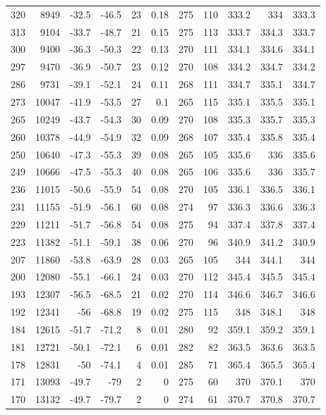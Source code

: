 \documentclass{article}
\begin{document}
\begin{longtable}{|r|r|r|r|r|r|r|r|r|r|r}
320 & 8949 & -32.5 & -46.5 & 23 & 0.18 & 275 & 110 & 333.2 & 334 & 333.3 \\
313 & 9104 & -33.7 & -48.7 & 21 & 0.15 & 275 & 113 & 333.7 & 334.3 & 333.7 \\
300 & 9400 & -36.3 & -50.3 & 22 & 0.13 & 270 & 111 & 334.1 & 334.6 & 334.1 \\
297 & 9470 & -36.9 & -50.7 & 23 & 0.12 & 270 & 108 & 334.2 & 334.7 & 334.2 \\
286 & 9731 & -39.1 & -52.1 & 24 & 0.11 & 268 & 111 & 334.7 & 335.1 & 334.7 \\
273 & 10047 & -41.9 & -53.5 & 27 & 0.1 & 265 & 115 & 335.1 & 335.5 & 335.1 \\
265 & 10249 & -43.7 & -54.3 & 30 & 0.09 & 270 & 108 & 335.3 & 335.7 & 335.3 \\
260 & 10378 & -44.9 & -54.9 & 32 & 0.09 & 268 & 107 & 335.4 & 335.8 & 335.4 \\
250 & 10640 & -47.3 & -55.3 & 39 & 0.08 & 265 & 105 & 335.6 & 336 & 335.6 \\
249 & 10666 & -47.5 & -55.3 & 40 & 0.08 & 265 & 106 & 335.6 & 336 & 335.7 \\
236 & 11015 & -50.6 & -55.9 & 54 & 0.08 & 270 & 105 & 336.1 & 336.5 & 336.1 \\
231 & 11155 & -51.9 & -56.1 & 60 & 0.08 & 274 & 97 & 336.3 & 336.6 & 336.3 \\
229 & 11211 & -51.7 & -56.8 & 54 & 0.08 & 275 & 94 & 337.4 & 337.8 & 337.4 \\
223 & 11382 & -51.1 & -59.1 & 38 & 0.06 & 270 & 96 & 340.9 & 341.2 & 340.9 \\
207 & 11860 & -53.8 & -63.9 & 28 & 0.03 & 265 & 105 & 344 & 344.1 & 344 \\
200 & 12080 & -55.1 & -66.1 & 24 & 0.03 & 270 & 112 & 345.4 & 345.5 & 345.4 \\
193 & 12307 & -56.5 & -68.5 & 21 & 0.02 & 270 & 114 & 346.6 & 346.7 & 346.6 \\
192 & 12341 & -56 & -68.8 & 19 & 0.02 & 275 & 115 & 348 & 348.1 & 348 \\
184 & 12615 & -51.7 & -71.2 & 8 & 0.01 & 280 & 92 & 359.1 & 359.2 & 359.1 \\
181 & 12721 & -50.1 & -72.1 & 6 & 0.01 & 282 & 82 & 363.5 & 363.6 & 363.5 \\
178 & 12831 & -50 & -74.1 & 4 & 0.01 & 285 & 71 & 365.4 & 365.5 & 365.4 \\
171 & 13093 & -49.7 & -79 & 2 & 0 & 275 & 60 & 370 & 370.1 & 370 \\
170 & 13132 & -49.7 & -79.7 & 2 & 0 & 274 & 61 & 370.7 & 370.8 & 370.7 \\

\end{longtable}
\end{document}
